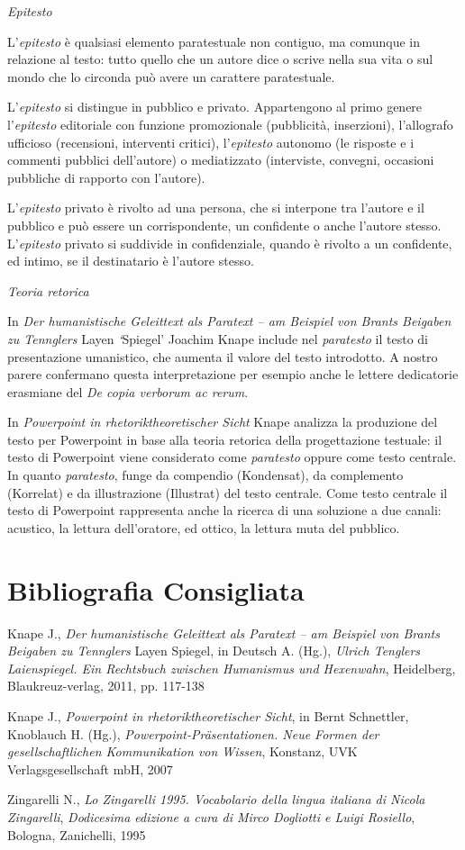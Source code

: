 \emph{Epitesto}

L'\emph{epitesto} è qualsiasi elemento paratestuale non contiguo, ma
comunque in relazione al testo: tutto quello che un autore dice o scrive
nella sua vita o sul mondo che lo circonda può avere un carattere
paratestuale.

L'\emph{epitesto} si distingue in pubblico e privato. Appartengono al
primo genere l'\emph{epitesto} editoriale con funzione promozionale
(pubblicità, inserzioni), l'allografo ufficioso (recensioni, interventi
critici), l'\emph{epitesto} autonomo (le risposte e i commenti pubblici
dell'autore) o mediatizzato (interviste, convegni, occasioni pubbliche
di rapporto con l'autore).

L'\emph{epitesto} privato è rivolto ad una persona, che si interpone tra
l'autore e il pubblico e può essere un corrispondente, un confidente o
anche l'autore stesso. L'\emph{epitesto} privato si suddivide in
confidenziale, quando è rivolto a un confidente, ed intimo, se il
destinatario è l'autore stesso.

\emph{Teoria retorica}

In \emph{Der humanistische Geleittext als Paratext -- am Beispiel von
Brants Beigaben zu Tennglers} Layen \emph{`}Spiegel' Joachim Knape
include nel \emph{paratesto} il testo di presentazione umanistico, che
aumenta il valore del testo introdotto. A nostro parere confermano
questa interpretazione per esempio anche le lettere dedicatorie
erasmiane del \emph{De copia verborum ac rerum}.

In \emph{Powerpoint in rhetoriktheoretischer Sicht} Knape analizza la
produzione del testo per Powerpoint in base alla teoria retorica della
progettazione testuale: il testo di Powerpoint viene considerato come
\emph{paratesto} oppure come testo centrale. In quanto \emph{paratesto},
funge da compendio (Kondensat), da complemento (Korrelat) e da
illustrazione (Illustrat) del testo centrale. Come testo centrale il
testo di Powerpoint rappresenta anche la ricerca di una soluzione a due
canali: acustico, la lettura dell'oratore, ed ottico, la lettura muta
del pubblico.

\section*{Bibliografia Consigliata}
{\parindent0pt 
Knape J., \emph{Der humanistische Geleittext als Paratext -- am Beispiel
von Brants Beigaben zu Tennglers} Layen Spiegel, in Deutsch A. (Hg.),
\emph{Ulrich Tenglers Laienspiegel. Ein Rechtsbuch zwischen Humanismus
und Hexenwahn}, Heidelberg, Blaukreuz-verlag, 2011, pp. 117-138

Knape J., \emph{Powerpoint in rhetoriktheoretischer Sicht}, in Bernt
Schnettler, Knoblauch H. (Hg.), \emph{Powerpoint-Präsentationen. Neue
Formen der gesellschaftlichen Kommunikation von Wissen}, Konstanz, UVK
Verlagsgesellschaft mbH, 2007

Zingarelli N., \emph{Lo Zingarelli 1995. Vocabolario della lingua
italiana di Nicola Zingarelli}, \emph{Dodicesima edizione a cura di
Mirco Dogliotti e Luigi Rosiello}, Bologna, Zanichelli, 1995
}

